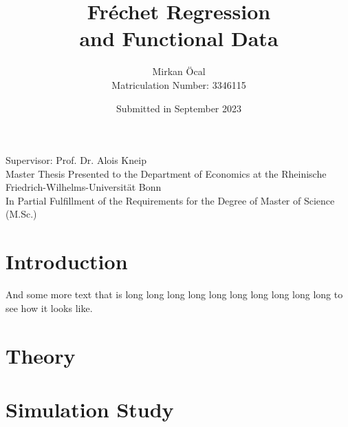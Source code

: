 \documentclass[12pt, a4paper, bibtotoc, liststotoc]{scrartcl}
\begin{document}
\begin{titlepage}
    \title{
        Fréchet Regression \\
        and Functional Data
    }
    \vspace{\fill}
    \author{Mirkan Öcal \\ Matriculation Number: 3346115}
    \date{Submitted in September 2023}
    \maketitle

    \vspace{\fill}
    \begin{center}
        \large
        Supervisor: Prof. Dr. Alois Kneip \\
        \vspace{\fill}
        Master Thesis Presented to the Department of Economics at the
        Rheinische Friedrich-Wilhelms-Universität Bonn \\

        In Partial Fulfillment of the Requirements for the Degree of Master
        of Science (M.Sc.)
    \end{center}

    \thispagestyle{empty}
\end{titlepage}


\newpage %
\tableofcontents    %
\listoftables       %
\listoffigures      %

\newpage
{}

\section{Introduction}
\label{sec:introduction}

\citet{petersen_frechet_2019}
\citet{hall_methodology_2007}

And some more text that is long long long long long long long long long long to see how
it looks like.

\section{Theory}
\label{sec:theory}

\section{Simulation Study}
\label{sec:simulation study}
\end{document}
